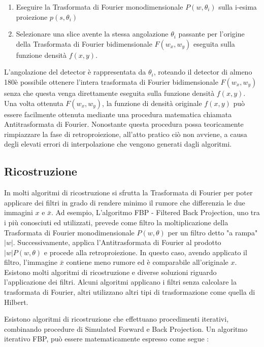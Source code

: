 \documentclass[a4paper,12pt, doubleside]{report}
\begin{document}
                    \begin{enumerate}
                        \item Eseguire la Trasformata di Fourier monodimensionale $P(w,\theta_i)$ sulla i-esima proiezione $p(s,\theta_i)$
                        \item Selezionare una slice avente la stessa angolazione $\theta_i$ passante per l'origine della Trasformata di Fourier bidimensionale $F(w_x,w_y)$ eseguita sulla funzione densità $f(x,y)$.  
                    \end{enumerate}
                \par
                    L'angolazione del detector è rappresentata da $\theta_i$, roteando il detector di almeno 180\degree è possibile ottenere l'intera trasformata di Fourier bidimensionale $F(w_x,w_y)$ senza che questa venga direttamente eseguita sulla funzione densità $f(x,y)$.
                    Una volta ottenuta $F(w_x,w_y)$, la funzione di densità originale $f(x,y)$ può essere facilmente ottenuta mediante una procedura matematica chiamata Antitrasformata di Fourier. Nonostante questa procedura possa teoricamente rimpiazzare la fase di retroproiezione, all'atto pratico ciò non avviene, a causa degli elevati errori di interpolazione che vengono generati dagli algoritmi.
            
            \subsection{Ricostruzione}
                \par
                    In molti algoritmi di ricostruzione si sfrutta la Trasformata di Fourier per poter applicare dei filtri in grado di rendere minimo il rumore che differenzia le due immagini $x$ e $\bar{x}$. Ad esempio, L'algoritmo FBP - Filtered Back Projection, uno tra i più conosciuti ed utilizzati, prevede come filtro la moltiplicazione della Trasformata di Fourier monodimensionale $P(w,\theta)$ per un filtro detto "a rampa" $|w|$. Successivamente, applica l'Antitrasformata di Fourier al prodotto $|w|P(w, \theta)$ e procede alla retroproiezione. In questo caso, avendo applicato il filtro, l'immagine $\bar{x}$ contiene meno rumore ed è comparabile all'originale $x$. Esistono molti algoritmi di ricostruzione e diverse soluzioni riguardo l'applicazione dei filtri. Alcuni algoritmi applicano i filtri senza calcolare la trasformata di Fourier, altri utilizzano altri tipi di trasformazione come quella di Hilbert. 
                \bigskip
                \par
                    Esistono algoritmi di ricostruzione che effettuano procedimenti iterativi, combinando procedure di Simulated Forward e Back Projection. Un algoritmo iterativo FBP, può essere matematicamente espresso come segue \cite{fessler}:
                   
\end{document}
